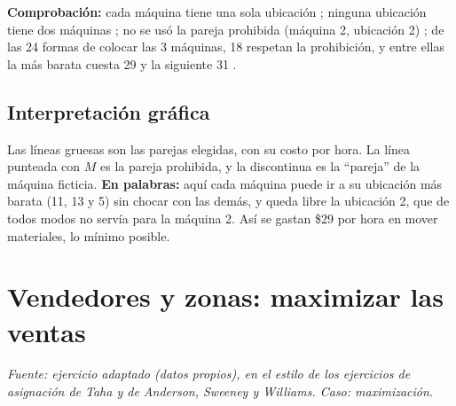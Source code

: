 \documentclass[11pt,a4paper]{article}
\begin{document}
\textbf{Comprobación:} cada máquina tiene una sola ubicación \checkmark; ninguna ubicación tiene dos máquinas
\checkmark; no se usó la pareja prohibida (máquina 2, ubicación 2) \checkmark; de las 24 formas de colocar las 3 máquinas,
18 respetan la prohibición, y entre ellas la más barata cuesta 29 y la siguiente 31 \checkmark.

\subsection*{Interpretación gráfica}
\begin{center}
\end{center}
Las líneas gruesas son las parejas elegidas, con su costo por hora. La línea punteada con $M$ es la pareja
prohibida, y la discontinua es la ``pareja'' de la máquina ficticia. \textbf{En palabras:} aquí cada
máquina puede ir a su ubicación más barata (11, 13 y 5) sin chocar con las demás, y queda libre la ubicación 2,
que de todos modos no servía para la máquina 2. Así se gastan \$29 por hora en mover materiales, lo mínimo posible.

\section{Vendedores y zonas: maximizar las ventas}
\textit{Fuente: ejercicio adaptado (datos propios), en el estilo de los ejercicios de asignación de Taha y de
Anderson, Sweeney y Williams. Caso: maximización.}
\end{document}
